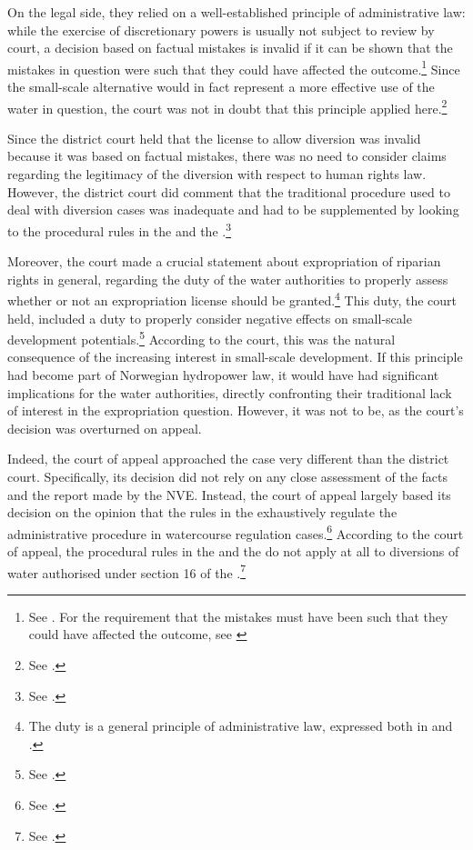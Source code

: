 On the legal side, they relied on a well-established principle of administrative law: while the exercise of discretionary powers is usually not subject to review by court, a decision based on factual mistakes is invalid if it can be shown that the mistakes in question were such that they could have affected the outcome.\footnote{See \cite[407-410]{eckhoff14}. For the requirement that the mistakes must have been such that they could have affected the outcome, see \cite[41]{paa67}} Since the small-scale alternative would in fact represent a more effective use of the water in question, the court was not in doubt that this principle applied here.\footnote{See \cite[25]{jorpeland09}.}

Since the district court held that the license to allow diversion was invalid because it was based on factual mistakes, there was no need to consider claims regarding the legitimacy of the diversion with respect to human rights law. However, the district court did comment that the traditional procedure used to deal with diversion cases was inadequate and had to be supplemented by looking to the procedural rules in the \cite{ea59} and the \cite{paa67}.\footnote{See \cite[21]{jorpeland09}.} 

Moreover, the court made a crucial statement about expropriation of riparian rights in general, regarding the duty of the water authorities to properly assess whether or not an expropriation license should be granted.\footnote{The duty is a general principle of administrative law, expressed both in \cite[12]{ea59} and \cite[16]{paa67}.} This duty, the court held, included a duty to properly consider negative effects on small-scale development potentials.\footnote{See \cite[22]{jorpeland09}.} According to the court, this was the natural consequence of the increasing interest in small-scale development. If this principle had become part of Norwegian hydropower law, it would have had significant implications for the water authorities, directly confronting their traditional lack of interest in the expropriation question. However, it was not to be, as the court's decision was overturned on appeal.

Indeed, the court of appeal approached the case very different than the district court. Specifically, its decision did not rely on any close assessment of the facts and the report made by the NVE. Instead, the court of appeal largely based its decision on the opinion that the rules in the \cite{wra17} exhaustively regulate the administrative procedure in watercourse regulation cases.\footnote{See \cite[7]{jorpeland11a}.} According to the court of appeal, the procedural rules in the \cite{ea59} and the \cite{paa67} do not apply at all to diversions of water authorised under section 16 of the \cite{wra17}.\footnote{See \cite[7]{jorpeland11a}.} 

